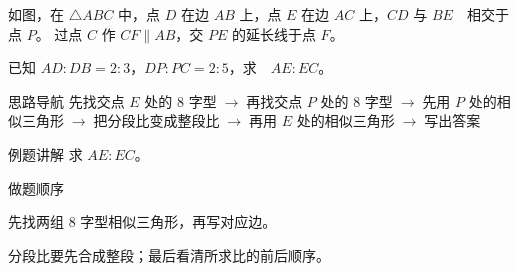\documentclass{exam-zh}
\begin{document}

\begin{eduProblemBlock}[例题]
\noindent
\begin{minipage}[t]{\dimexpr\linewidth-70mm-6mm\relax}
\vspace{0pt}
如图，在 $\triangle ABC$ 中，点 $D$ 在边 $AB$ 上，点 $E$ 在边 $AC$ 上，$CD$ 与 $BE$\ \ 相交于点 $P$。
过点 $C$ 作 $CF\parallel AB$，交 $PE$ 的延长线于点 $F$。

已知 $AD:DB=2:3$，$DP:PC=2:5$，求\ \ $AE:EC$。

\end{minipage}\hfill
\begin{diagramcoltikz}{70mm}{平行线已经作好，先从图中找相似三角形。}
}
\end{diagramcoltikz}
\end{eduProblemBlock}





\begin{eduAuxItem}{思路导航}
先找交点 $E$ 处的 8 字型$\;\to\;$再找交点 $P$ 处的 8 字型$\;\to\;$先用 $P$ 处的相似三角形$\;\to\;$把分段比变成整段比$\;\to\;$再用 $E$ 处的相似三角形$\;\to\;$写出答案\end{eduAuxItem}




\begin{eduSubQuestionItem}{例题讲解}
求 $AE:EC$。\end{eduSubQuestionItem}

\begin{eduDualExplain}
  \begin{eduExplainLeft}
  \end{eduExplainLeft}

  \begin{eduExplainRight}
  \end{eduExplainRight}
\end{eduDualExplain}




\begin{eduSummaryBlock}{\eduIconPin}{做题顺序}
\begin{eduBulletList}
  \item 先找两组 8 字型相似三角形，再写对应边。  \item 分段比要先合成整段；最后看清所求比的前后顺序。\end{eduBulletList}
\end{eduSummaryBlock}
\end{document}

